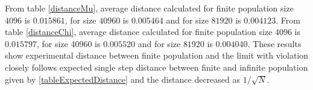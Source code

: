 \newpage

From table \ref{distanceMu}, average distance calculated for finite population size $4096$ is $0.015861$, 
for size $40960$ is $0.005464$ and for size $81920$ is $0.004123$. From table \ref{distanceChi}, 
average distance calculated for finite population size $4096$ is $0.015797$, 
for size $40960$ is $0.005520$ and for size $81920$ is $0.004040$.
These results show experimental distance between finite population and the limit with violation closely follows expected single step distance 
between finite and infinite population given by \ref{tableExpectedDistance} and the distance decreased as $1/\sqrt{N}$.








 

